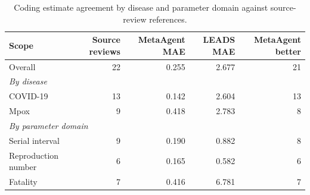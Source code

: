 \begin{table}[H]
\centering
\caption{Coding estimate agreement by disease and parameter domain against source-review references.}
\label{tab:coding-leads-summary}
\small
\begin{tabular}{lrrrr}
\toprule
Scope & Source reviews & MetaAgent MAE & LEADS MAE & MetaAgent better \\
\midrule
Overall & 22 & 0.255 & 2.677 & 21 \\
\midrule
\multicolumn{5}{l}{\textit{By disease}} \\
COVID-19 & 13 & 0.142 & 2.604 & 13 \\
Mpox & 9 & 0.418 & 2.783 & 8 \\
\midrule
\multicolumn{5}{l}{\textit{By parameter domain}} \\
Serial interval & 9 & 0.190 & 0.882 & 8 \\
Reproduction number & 6 & 0.165 & 0.582 & 6 \\
Fatality & 7 & 0.416 & 6.781 & 7 \\
\bottomrule
\end{tabular}
\end{table}
